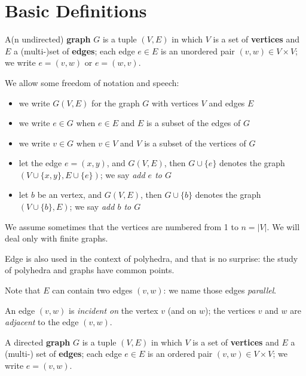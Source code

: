 \section{Basic Definitions}

\begin{definition}[Graph]
A(n undirected) \textbf{graph} $G$ is a tuple $(V,E)$ in which
$V$ is a set of \textbf{vertices} and $E$ a (multi-)set\footnotemark
of \textbf{edges}; each edge $e \in E$ is an unordered pair $(v,w) \in
V \times V$; we write $e = (v,w)$ or $e = (w,v)$.
\end{definition}


We allow some freedom of notation and speech:
\begin{itemize}
\item
we write $G(V,E)$ for the graph $G$ with vertices $V$ and edges $E$
\item
we write $e \in G$ when $e \in E$ and $E$ is a subset of the edges of $G$
\item
we write $v \in G$ when $v \in V$ and $V$ is a subset of the vertices of $G$
\item
let the edge $e = (x,y)$, and $G(V,E)$, then $G \cup \{e\}$ denotes
the graph $(V \cup \{x,y\},E \cup \{e\})$; we say {\em add $e$ to $G$}
\item
let $b$ be an vertex, and $G(V,E)$, then $G \cup \{b\}$ denotes the
graph $(V \cup \{b\},E )$; we say {\em add $b$ to $G$}
\end{itemize}

We assume sometimes that the vertices are numbered from 1 to $n =
|V|$. We will deal only with finite graphs.

Edge is also used in the context of polyhedra, and that is no
surprise: the study of polyhedra and graphs have common points.

Note that $E$ can contain two edges $(v,w)$: we name those edges {\em
parallel}.

An edge $(v,w)$ is {\em incident on} the vertex $v$ (and on $w$);
the vertices $v$ and $w$ are {\em adjacent} to the edge $(v,w)$.

\begin{definition}
A directed \textbf{graph} $G$ is a tuple $(V,E)$ in which
$V$ is a set of \textbf{vertices} and $E$ a (multi-) set
of \textbf{edges}; each edge $e \in E$ is an ordered pair $(v,w) \in
V \times V$; we write $e = (v,w)$.
\end{definition}

